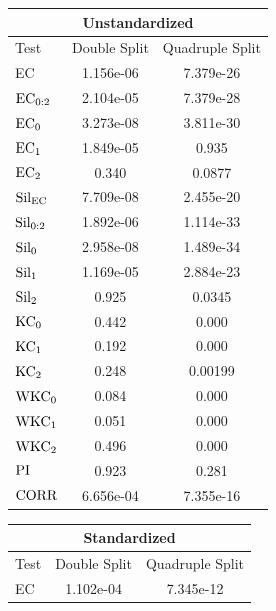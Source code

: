 \documentclass[12pt]{article}
\begin{document}
\begin{table}[htp!]
    \begin{center}
        \begin{tabular}{ l | c | c }
          \toprule
          \multicolumn{3}{c}{Unstandardized} \\
          \toprule
          Test & Double Split & Quadruple Split \\
          \midrule
          EC & 1.156e-06 & 7.379e-26 \\
          $\textup{EC}_{0:2}$ & 2.104e-05 & 7.379e-28 \\
          $\textup{EC}_{0}$ & 3.273e-08 & 3.811e-30 \\
          $\textup{EC}_{1}$ &  1.849e-05 & 0.935 \\
          $\textup{EC}_{2}$ & 0.340 & 0.0877 \\
          \midrule
          $\textup{Sil}_{\textup{EC}}$ & 7.709e-08 & 2.455e-20 \\ 
          $\textup{Sil}_{0:2}$ & 1.892e-06 & 1.114e-33 \\
          $\textup{Sil}_{0}$ & 2.958e-08 & 1.489e-34 \\
          $\textup{Sil}_{1}$ & 1.169e-05 & 2.884e-23 \\
          $\textup{Sil}_{2}$ & 0.925 & 0.0345 \\
          \midrule
          $\textup{KC}_{0}$ & 0.442 & 0.000 \\
          $\textup{KC}_{1}$ & 0.192 & 0.000 \\
          $\textup{KC}_{2}$ & 0.248 & 0.00199 \\
          \midrule
          $\textup{WKC}_{0}$ & 0.084 & 0.000 \\
          $\textup{WKC}_{1}$ & 0.051 & 0.000 \\
          $\textup{WKC}_{2}$ & 0.496 & 0.000 \\
          $\textup{PI}$ & 0.923 & 0.281 \\
          \midrule
          $\textup{CORR}$ & 6.656e-04 & 7.355e-16 \\
          \bottomrule
        \end{tabular}
        \begin{tabular}{ l | c |  c }
          \toprule
          \multicolumn{3}{c}{Standardized} \\
          \toprule
          Test & Double Split & Quadruple Split \\
          \midrule
          EC & 1.102e-04 &  7.345e-12 \\

\end{tabular}
\end{center}
\end{table}
\end{document}
